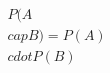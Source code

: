 \documentclass[preview]{standalone}
\begin{document}
\begin{align*}
P(A \\cap B) = P(A) \\cdot P(B)
\end{align*}
\end{document}
